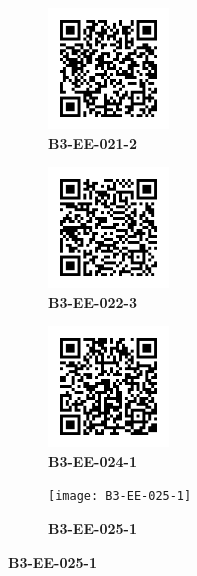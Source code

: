 \documentclass{article}
\begin{document}
	\begin{figure}[]
		\centering
		\begin{subfigure}{0.19\textwidth}
			\centering
			\includegraphics[width = 3.2cm,height = 3.2cm]{B3-EE-021-2}
			\caption*{\large{\textbf{B3-EE-021-2}}}
		\end{subfigure}\hfil
		\begin{subfigure}{0.19\textwidth}
			\centering
			\includegraphics[width = 3.2cm,height = 3.2cm]{B3-EE-022-3}
			\caption*{\large{\textbf{B3-EE-022-3}}}
		\end{subfigure}\hfil
		\begin{subfigure}{0.19\textwidth}
			\centering
			\includegraphics[width = 3.2cm,height = 3.2cm]{B3-EE-024-1}
			\caption*{\large{\textbf{B3-EE-024-1}}}
		\end{subfigure}\hfil
		\begin{subfigure}{0.19\textwidth}
			\centering
			\texttt{[image: B3-EE-025-1]}
			\caption*{\large{\textbf{B3-EE-025-1}}}
		\end{subfigure}\hfil
	\end{figure}
\end{document}
